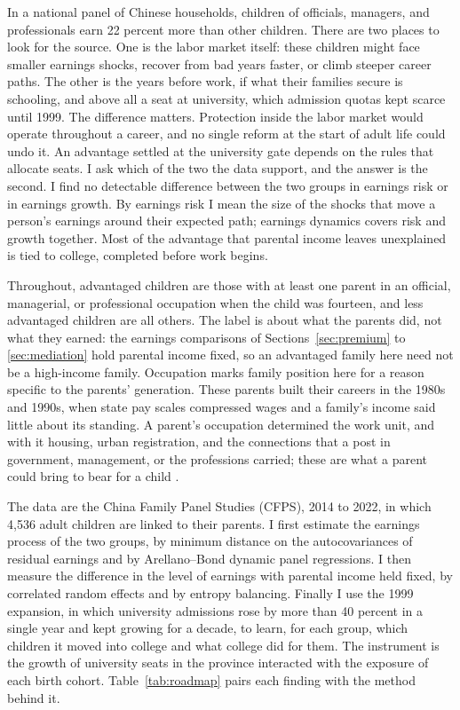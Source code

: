 \documentclass[11pt]{article}
\begin{document}
In a national panel of Chinese households, children of officials, managers, and professionals earn 22 percent more than other children. There are two places to look for the source. One is the labor market itself: these children might face smaller earnings
shocks, recover from bad years faster, or climb steeper career paths.
The other is the years before work, if what their families
secure is schooling, and above all a seat at university, which
admission quotas kept scarce until 1999. The difference matters. Protection inside the labor
market would operate throughout a career, and no single reform at the
start of adult life could undo it. An advantage settled at the
university gate depends on the rules that allocate seats. I ask which of the two the data support, and the answer is the second. I find no detectable difference between the two groups in earnings risk or in earnings growth. By earnings risk I mean the size of the shocks that
move a person's earnings around their expected path; earnings dynamics
covers risk and growth together. Most of the advantage that parental income leaves unexplained is tied to college, completed before work begins.

Throughout, advantaged children
are those with at least one parent in an official, managerial, or
professional occupation when the child was fourteen, and less advantaged children are all others. The label is about what the parents did, not what they earned: the earnings comparisons of Sections~\ref{sec:premium} to \ref{sec:mediation} hold parental income fixed, so an advantaged family here need not be a high-income family. Occupation marks family
position here for a reason specific to the parents' generation. These
parents built their careers in the 1980s and 1990s, when state pay
scales compressed wages and a family's income said little about its
standing. A parent's occupation determined the work unit, and with it housing, urban registration, and the connections that a post in government, management, or the professions carried; these are what a parent could bring to bear for a child \citep{BianLogan1996,
WuTreiman2007}.

The data are the China Family Panel Studies (CFPS), 2014 to 2022, in which 4,536 adult children are linked to their parents. I first estimate the earnings process of the two groups, by minimum
distance on the autocovariances of residual earnings and by Arellano--Bond
dynamic panel regressions. I then measure the difference in the level of earnings with parental
income held fixed, by correlated random effects and by entropy
balancing. Finally I use the 1999 expansion, in which university admissions rose
by more than 40 percent in a single year and kept growing for a decade, to learn, for each group, which children it moved into college and what college did for them. The instrument is the growth of university seats in the province interacted with the exposure of each birth cohort.
Table~\ref{tab:roadmap}
pairs each finding with the method behind it.
\end{document}
